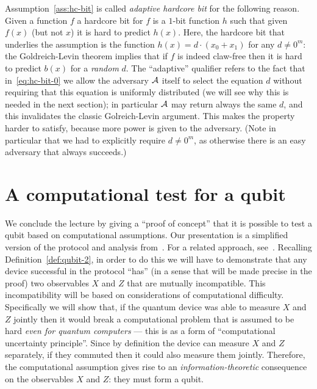 \begin{remark}
Assumption~\ref{ass:hc-bit} is called \emph{adaptive hardcore bit} for the following reason. Given a function $f$ a hardcore bit for $f$ is a $1$-bit function $h$ such that given $f(x)$ (but not $x$) it is hard to predict $h(x)$. Here, the hardcore bit that underlies the assumption is the function $h(x)=d\cdot (x_0+x_1)$ for any $d\neq 0^m$: the Goldreich-Levin theorem implies that if $f$ is indeed claw-free then it is hard to predict $b(x)$ for a \emph{random} $d$. The ``adaptive'' qualifier refers to the fact that in~\eqref{eq:hc-bit-0} we allow the adversary $\mathcal{A}$ itself to select the equation $d$ without requiring that this equation is uniformly distributed  (we will see why this is needed in the next section); in particular $\mathcal{A}$ may return always the same $d$, and this invalidates the classic Golreich-Levin argument. This makes the property harder to satisfy, because more power is given to the adversary. (Note in particular that we had to explicitly require $d\neq 0^m$, as otherwise there is an easy adversary that always succeeds.)
\end{remark}

\section{A computational test for a qubit}
\label{sec:comp-test}

We conclude the lecture by giving a ``proof of concept'' that it is possible to test a qubit based on computational assumptions. Our presentation is a simplified version of the protocol and analysis from~\cite{brakerski2018cryptographic}. For a related approach, see~\cite{cojocaru2019qfactory}. Recalling Definition~\ref{def:qubit-2}, in order to do this we will have to demonstrate that any device successful in the protocol ``has'' (in a sense that will be made precise in the proof) two observables 
 $X$ and $Z$ that are mutually incompatible. This incompatibility will be based on considerations of computational difficulty. Specifically we will show that, if the quantum device was able to measure $X$ and $Z$ jointly then it would  break a computational problem that is assumed to be hard \emph{even for quantum computers} --- this is as a form of ``computational uncertainty principle''. Since by definition the device can measure $X$ and $Z$ separately, if they commuted then it could also measure them jointly. Therefore, the computational assumption gives rise to an \emph{information-theoretic} consequence on the observables $X$ and $Z$: they must form a qubit.  

